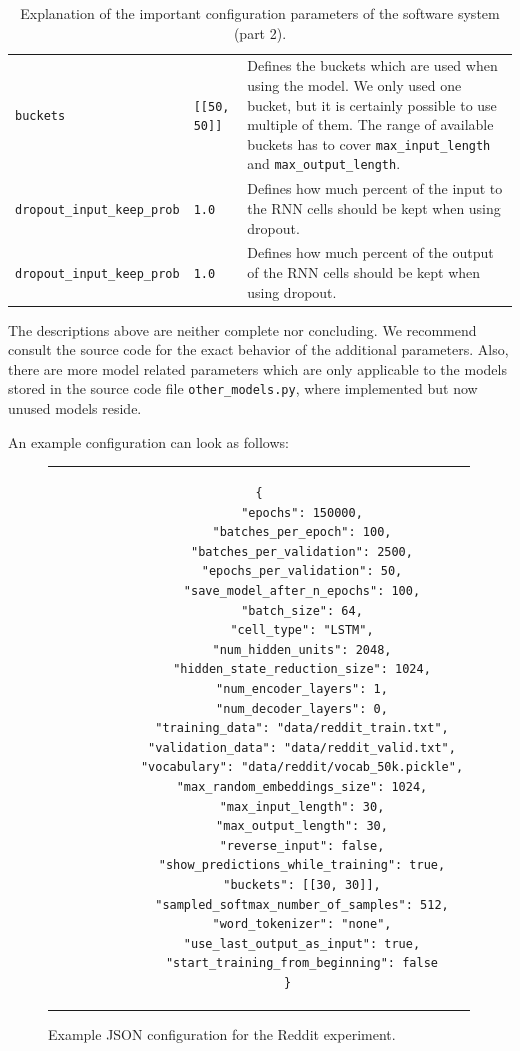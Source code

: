 \begin{table}[H]
\begin{adjustbox}{max width=\textwidth, max height=\textheight}
\begin{tabular}{llp{10cm}}
		\texttt{buckets} & \texttt{[[50, 50]]} & Defines the buckets which are used when using the model. We only used one bucket, but it is certainly possible to use multiple of them. The range of available buckets has to cover \texttt{max{\_}input\_length} and \texttt{max{\_}output\_length}.\\
		\texttt{dropout\_input\_keep\_prob} & \texttt{1.0} & Defines how much percent of the input to the RNN cells should be kept when using dropout.\\
		\texttt{dropout\_input\_keep\_prob} & \texttt{1.0} & Defines how much percent of the output of the RNN cells should be kept when using dropout.\\
		\bottomrule
		\end{tabular}
	\end{adjustbox}
	\caption{Explanation of the important configuration parameters of the software system (part 2).}
\end{table}


The descriptions above are neither complete nor concluding. We recommend consult the source code for the exact behavior of the additional parameters. Also, there are more model related parameters which are only applicable to the models stored in the source code file \texttt{other\_models.py}, where implemented but now unused models reside.

\clearpage

An example configuration can look as follows:

\begin{figure}[thp]
	\centering
	\begin{tabular}{c}  %
		\begin{lstlisting}[style=json]
		{
			"epochs": 150000,
			"batches_per_epoch": 100,
			"batches_per_validation": 2500,
			"epochs_per_validation": 50,
			"save_model_after_n_epochs": 100,
			"batch_size": 64,
			"cell_type": "LSTM",
			"num_hidden_units": 2048,
			"hidden_state_reduction_size": 1024,
			"num_encoder_layers": 1,
			"num_decoder_layers": 0,
			"training_data": "data/reddit_train.txt",
			"validation_data": "data/reddit_valid.txt",
			"vocabulary": "data/reddit/vocab_50k.pickle",
			"max_random_embeddings_size": 1024,
			"max_input_length": 30,
			"max_output_length": 30,
			"reverse_input": false,
			"show_predictions_while_training": true,
			"buckets": [[30, 30]],
			"sampled_softmax_number_of_samples": 512,
			"word_tokenizer": "none",
			"use_last_output_as_input": true,
			"start_training_from_beginning": false
		}
		\end{lstlisting}
	\end{tabular}
	\label{software_usage:config_json_example}
	\caption{Example JSON configuration for the Reddit experiment.}
\end{figure}

